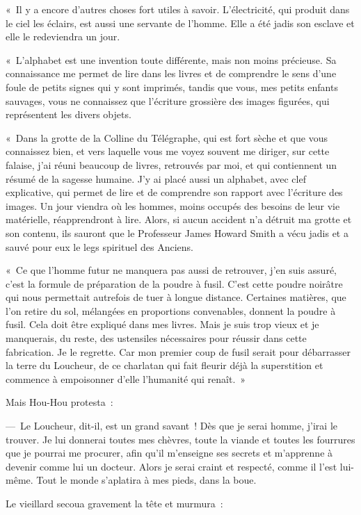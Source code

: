 \documentclass[french,twoside]{book} %
\begin{document}
« Il y a encore d’autres choses fort utiles à savoir. L’électricité, qui produit dans le ciel les éclairs, est aussi une servante de l’homme. Elle a été jadis son esclave et elle le redeviendra un jour.\par
« L’alphabet est une invention toute différente, mais non moins précieuse. Sa connaissance me permet de lire dans les livres et de comprendre le sens d’une foule de petits signes qui y sont imprimés, tandis que vous, mes petits enfants sauvages, vous ne connaissez que l’écriture grossière des images figurées, qui représentent les divers objets.\par
« Dans la grotte de la Colline du Télégraphe, qui est fort sèche et que vous connaissez bien, et vers laquelle vous me voyez souvent me diriger, sur cette falaise, j’ai réuni beaucoup de livres, retrouvés par moi, et qui contiennent un résumé de la sagesse humaine. J’y ai placé aussi un alphabet, avec clef explicative, qui permet de lire et de comprendre son rapport avec l’écriture des images. Un jour viendra où les hommes, moins occupés des besoins de leur vie matérielle, réapprendront à lire. Alors, si aucun accident n’a détruit ma grotte et son contenu, ils sauront que le Professeur James Howard Smith a vécu jadis et a sauvé pour eux le legs spirituel des Anciens.\par
« Ce que l’homme futur ne manquera pas aussi de retrouver, j’en suis assuré, c’est la formule de préparation de la poudre à fusil. C’est cette poudre noirâtre qui nous permettait autrefois de tuer à longue distance. Certaines matières, que l’on retire du sol, mélangées en proportions convenables, donnent la poudre à fusil. Cela doit être expliqué dans mes livres. Mais je suis trop vieux et je manquerais, du reste, des ustensiles nécessaires pour réussir dans cette fabrication. Je le regrette. Car mon premier coup de fusil serait pour débarrasser la terre du Loucheur, de ce charlatan qui fait fleurir déjà la superstition et commence à empoisonner d’elle l’humanité qui renaît. »\par
Mais Hou-Hou protesta :\par
— Le Loucheur, dit-il, est un grand savant ! Dès que je serai homme, j’irai le trouver. Je lui donnerai toutes mes chèvres, toute la viande et toutes les fourrures que je pourrai me procurer, afin qu’il m’enseigne ses secrets et m’apprenne à devenir comme lui un docteur. Alors je serai craint et respecté, comme il l’est lui-même. Tout le monde s’aplatira à mes pieds, dans la boue.\par
Le vieillard secoua gravement la tête et murmura :\par
\end{document}
